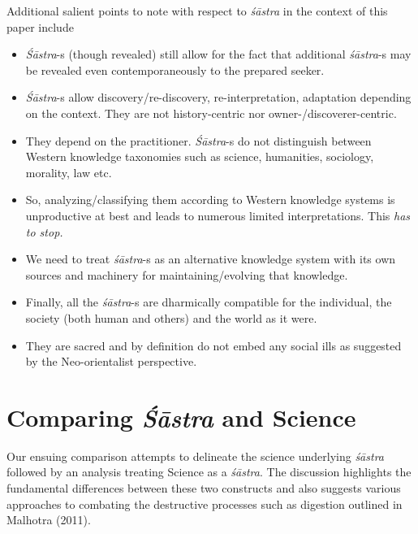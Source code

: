 \vskip 2pt

\vskip 2pt

Additional salient points to note with respect to \textit{śāstra} in the context of this paper include

\vskip 2pt

\begin{itemize}
\item \textit{Śāstra}-s (though revealed) still allow for the fact that additional \textit{śāstra}-s may be revealed even contemporaneously to the prepared seeker.

 \item \textit{Śāstra}-s allow discovery/re-discovery, re-interpretation, adaptation depending on the context. They are not history-centric nor owner-/discoverer-centric. 

 \item They depend on the practitioner. \textit{Śāstra}-s do not distinguish between Western knowledge taxonomies such as science, humanities, sociology, morality, law etc.

 \newpage

 \item So, analyzing/classifying them according to Western knowledge systems is unproductive at best and leads to numerous limited interpretations. This \textit{has to stop.}

 \item We need to treat \textit{śāstra}-s as an alternative knowledge system with its own sources and machinery for maintaining/evolving that knowledge.

 \item Finally, all the \textit{śāstra}-s are dharmically compatible for the individual, the society (both human and others) and the world as it were.

 \item They are sacred and by definition do not embed any social ills as suggested by the Neo-orientalist perspective.

\end{itemize}


\section*{Comparing \textit{Śāstra} and Science}

Our ensuing comparison attempts to delineate the science underlying \textit{śāstra} followed by an analysis treating Science as a \textit{śāstra}. The discussion highlights the fundamental differences between these two constructs and also suggests various approaches to combating the destructive processes such as digestion outlined in Malhotra (2011).


